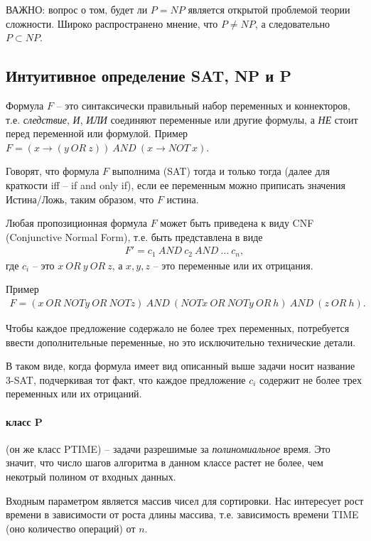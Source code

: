 \documentclass[%
	11pt,
	a4paper,
	utf8,
		]{article}
\begin{document}
ВАЖНО: вопрос о том, будет ли $ P = NP $ является открытой проблемой теории сложности. Широко распространено мнение, что $ P \neq NP $, а следовательно $ P \subset NP $.

\subsection{Интуитивное определение SAT, NP и P}

Формула $ F $ -- это синтаксически правильный набор переменных и коннекторов, т.е. \emph{следствие}, \emph{И}, \emph{ИЛИ} соединяют переменные или другие формулы, а \emph{НЕ} стоит перед переменной или формулой. Пример $ F = (x \rightarrow (y \ OR \ z)) \ AND \ (x \rightarrow NOT \ x) $.

Говорят, что формула $ F $ выполнима (SAT) тогда и только тогда (далее для краткости iff -- if and only if), если ее переменным можно приписать значения Истина/Ложь, таким образом, что $ F $ истина.

Любая пропозиционная формула $ F $ может быть приведена к виду CNF (Conjunctive Normal Form), т.е. быть представлена в виде
\begin{align*}
	F' = c_1 \ AND \ c_2 \ AND \ \ldots \ c_n,
\end{align*}
где $ c_i $ -- это $ x \ OR \ y \ OR \ z $, а $ x, y, z $ -- это переменные или их отрицания.

Пример
\begin{align*}
	F = (x \ OR \ NOT y \ OR \ NOT z) \ AND \ (NOT x \ OR \ NOT y \ OR \ h) \ AND \ (z \ OR \ h).
\end{align*}

Чтобы каждое предложение содержало не более трех переменных, потребуется ввести дополнительные переменные, но это исключительно технические детали.

В таком виде, когда формула имеет вид описанный выше задачи носит название 3-SAT, подчеркивая тот факт, что каждое предложение $ c_i $ содержит не более трех переменных или их отрицаний.

\paragraph{класс P} (он же класс PTIME) -- задачи разрешимые за \emph{полиномиальное} время. Это значит, что число шагов алгоритма в данном классе растет не более, чем некотрый полином от входных данных.

Входным параметром является массив чисел для сортировки. Нас интересует рост времени в зависимости от роста длины массива, т.е. зависимость времени TIME (оно количество операций) от $ n $. 
\end{document}
